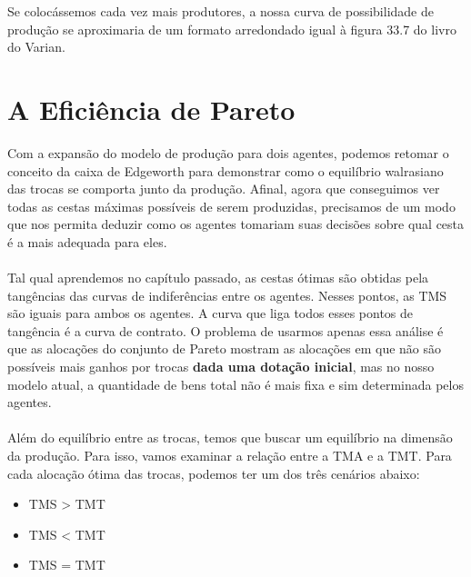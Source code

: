 \documentclass[a4paper,11pt,oneside]{book}
\theoremstyle{definition}
\theoremstyle{break}
\begin{document}
Se colocássemos cada vez mais produtores, a nossa curva de possibilidade de produção se aproximaria de um formato arredondado igual à figura 33.7 do livro do Varian.

\section{A Eficiência de Pareto}

Com a expansão do modelo de produção para dois agentes, podemos retomar o conceito da caixa de Edgeworth para demonstrar como o equilíbrio walrasiano das trocas se comporta junto da produção. Afinal, agora que conseguimos ver todas as cestas máximas possíveis de serem produzidas, precisamos de um modo que nos permita deduzir como os agentes tomariam suas decisões sobre qual cesta é a mais adequada para eles.
\\~\\
Tal qual aprendemos no capítulo passado, as cestas ótimas são obtidas pela tangências das curvas de indiferências entre os agentes. Nesses pontos, as TMS são iguais para ambos os agentes. A curva que liga todos esses pontos de tangência é a curva de contrato. O problema de usarmos apenas essa análise é que as alocações do conjunto de Pareto mostram as alocações em que não são possíveis mais ganhos por trocas \textbf{dada uma dotação inicial}, mas no nosso modelo atual, a quantidade de bens total não é mais fixa e sim determinada pelos agentes.
\\~\\
Além do equilíbrio entre as trocas, temos que buscar um equilíbrio na dimensão da produção. Para isso, vamos examinar a relação entre a TMA e a TMT. Para cada alocação ótima das trocas, podemos ter um dos três cenários abaixo:
\begin{itemize}
	\item TMS > TMT
	\item TMS < TMT
	\item TMS = TMT
\end{itemize}
\end{document}
